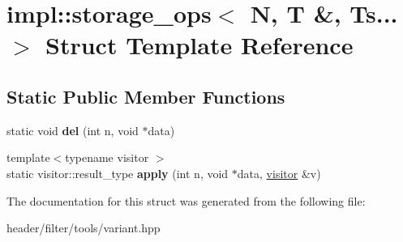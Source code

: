 \hypertarget{structimpl_1_1storage__ops_3_01_n_00_01_t_01_6_00_01_ts_8_8_8_01_4}{}\section{impl\+:\+:storage\+\_\+ops$<$ N, T \&, Ts... $>$ Struct Template Reference}
\label{structimpl_1_1storage__ops_3_01_n_00_01_t_01_6_00_01_ts_8_8_8_01_4}
\subsection*{Static Public Member Functions}
\begin{DoxyCompactItemize}
\item 
\mbox{\label{structimpl_1_1storage__ops_3_01_n_00_01_t_01_6_00_01_ts_8_8_8_01_4_a164e2d7c32409a12c24eca5941f11040}} 
static void {\bfseries del} (int n, void $\ast$data)
\item 
\mbox{\label{structimpl_1_1storage__ops_3_01_n_00_01_t_01_6_00_01_ts_8_8_8_01_4_a4c8e0a88b19d61c20ee61b06c601269e}} 
{\footnotesize template$<$typename visitor $>$ }\\static visitor\+::result\+\_\+type {\bfseries apply} (int n, void $\ast$data, \hyperlink{structvisitor}{visitor} \&v)
\end{DoxyCompactItemize}


The documentation for this struct was generated from the following file\+:\begin{DoxyCompactItemize}
\item 
header/filter/tools/variant.\+hpp\end{DoxyCompactItemize}
